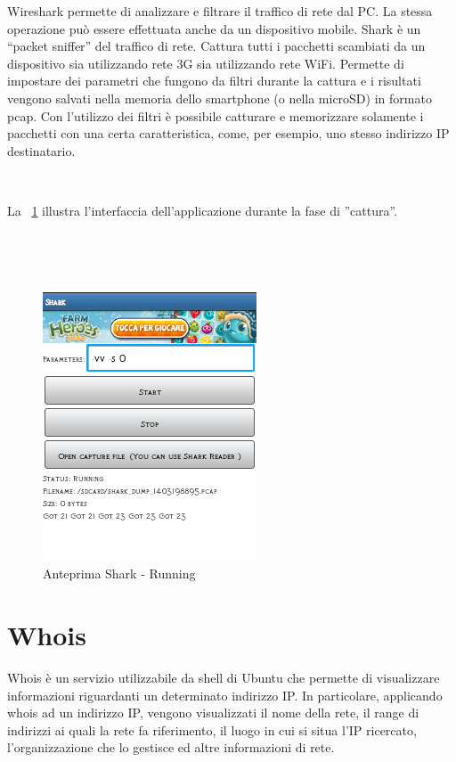 \documentclass[a4paper,11pt]{book}
\begin{document}
Wireshark permette di analizzare e filtrare il traffico di rete dal PC.
La stessa operazione pu\`o essere effettuata anche da un dispositivo mobile.
Shark \cite{rif7} \`e un ``packet sniffer'' del traffico di rete. Cattura tutti i pacchetti scambiati da un dispositivo sia utilizzando rete 3G sia utilizzando rete WiFi.
Permette di impostare dei parametri che fungono da filtri durante la cattura e i risultati vengono salvati nella memoria dello smartphone (o nella microSD) in formato pcap.
Con l'utilizzo dei filtri \`e possibile catturare e memorizzare solamente i pacchetti con una certa caratteristica, come, per esempio, uno stesso indirizzo IP destinatario.

~

La \figurename ~\ref{fig:go} illustra l'interfaccia dell'applicazione durante la fase di ''cattura''.

~


~

%
%
\begin{figure}[h!t]
\centering
\includegraphics[scale = 0.8]{shark_go}
\caption{Anteprima Shark - Running}
\label{fig:go}
\end{figure}

\clearpage

\section{Whois}
Whois \cite{rif8} \`e un servizio utilizzabile da shell di Ubuntu che permette di visualizzare informazioni riguardanti un determinato indirizzo IP.
In particolare, applicando whois ad un indirizzo IP, vengono visualizzati il nome della rete, il range di indirizzi ai quali la rete fa riferimento, il luogo in cui si situa l'IP ricercato, l'organizzazione che lo gestisce ed altre informazioni di rete.
\end{document}
